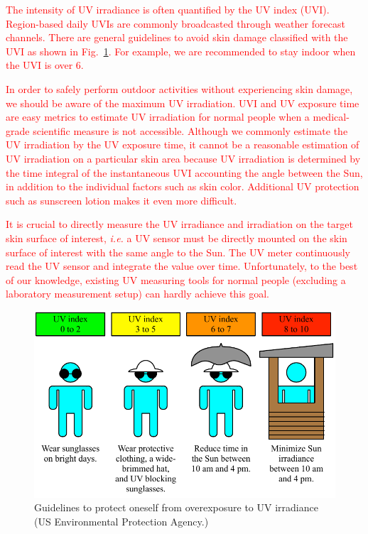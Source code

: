 \documentclass[journal]{IEEEtran}
\begin{document}
\textcolor{red}{The intensity of UV irradiance is often quantified by the UV index (UVI). Region-based daily UVIs are commonly broadcasted through weather forecast channels. There are general guidelines to avoid skin damage classified with the UVI as shown in Fig.~\ref{fig:guidelines}. For example, we are recommended to stay indoor when the UVI  is over 6.} 

\textcolor{red}{In order to safely perform outdoor activities without experiencing skin damage, we should be aware of  the maximum UV irradiation. UVI and UV exposure time are easy metrics to estimate UV irradiation for normal people when a medical-grade scientific measure is not accessible. Although we commonly estimate the UV irradiation by the UV exposure time, it cannot be a reasonable estimation of UV irradiation on a particular skin area because UV irradiation is determined by the time integral of the instantaneous UVI accounting the angle between the Sun, in addition to the individual factors such as skin color. Additional UV protection such as sunscreen lotion makes it even more difficult.} 

\textcolor{red}{It is crucial to directly measure the UV irradiance and irradiation on the target skin surface of interest, \textit{i.e.} a UV sensor must be directly mounted on the skin surface of interest with the same angle to the Sun. The UV meter continuously read the UV sensor and integrate the value over time. Unfortunately, to the best of our knowledge, existing UV measuring tools for normal people (excluding a laboratory measurement setup) can hardly achieve this goal.}

\begin{figure}
\centering
\includegraphics[width=1.0\hsize]{Figures/UVI_guideline.pdf}
\caption{Guidelines to protect oneself from overexposure to UV irradiance (US Environmental Protection Agency.)}
\label{fig:guidelines}
\end{figure}
\end{document}
